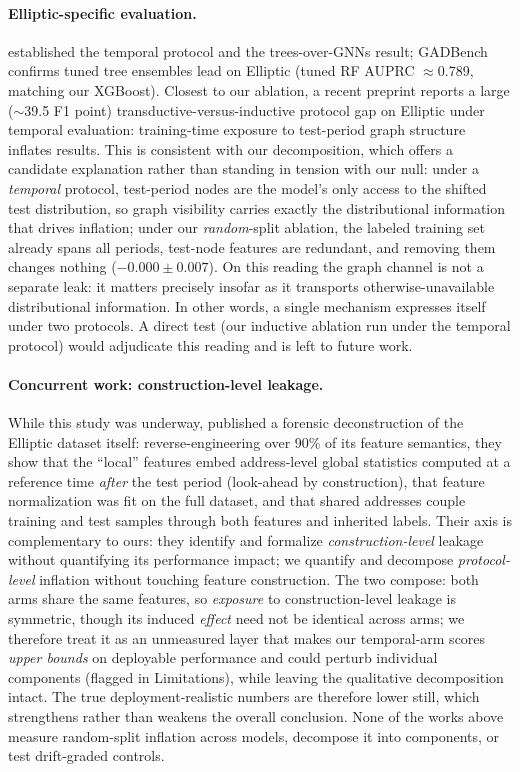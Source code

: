 \documentclass[10pt]{article}
\begin{document}
\paragraph{Elliptic-specific evaluation.} \citet{weber2019aml} established the
temporal protocol and the trees-over-GNNs result; GADBench \citep{tang2023gadbench}
confirms tuned tree ensembles lead on Elliptic (tuned RF AUPRC $\approx$0.789,
matching our XGBoost). Closest to our ablation, a recent preprint
\citep{maganti2026liability} reports a large ($\sim$39.5 F1 point)
transductive-versus-inductive protocol gap on Elliptic under temporal evaluation:
training-time exposure to test-period graph structure inflates results. This is
consistent with our decomposition, which offers a candidate explanation rather
than standing in tension with our null: under a \emph{temporal} protocol, test-period nodes are the model's only
access to the shifted test distribution, so graph visibility carries exactly the
distributional information that drives inflation; under our \emph{random}-split
ablation, the labeled training set already spans all periods, test-node features
are redundant, and removing them changes nothing ($-0.000\pm0.007$). On this
reading the graph channel is not a separate leak: it matters precisely insofar as
it transports otherwise-unavailable distributional information. In other words,
a single mechanism expresses itself under two protocols. A direct test (our inductive ablation run under the temporal
protocol) would adjudicate this reading and is left to future work.

\paragraph{Concurrent work: construction-level leakage.} While this study was
underway, \citet{safar2026opacity} published a forensic deconstruction of the
Elliptic dataset itself: reverse-engineering over 90\% of its feature semantics,
they show that the ``local'' features embed address-level global statistics
computed at a reference time \emph{after} the test period (look-ahead by
construction), that feature normalization was fit on the full dataset, and that
shared addresses couple training and test samples through both features and
inherited labels. Their axis is complementary to ours: they identify and formalize
\emph{construction-level} leakage without quantifying its performance impact; we
quantify and decompose \emph{protocol-level} inflation without touching feature
construction. The two compose: both arms share the same features, so \emph{exposure} to
construction-level leakage is symmetric, though its induced \emph{effect} need
not be identical across arms; we therefore treat it as an unmeasured layer that
makes our temporal-arm scores \emph{upper bounds} on deployable performance and
could perturb individual components (flagged in Limitations), while leaving the
qualitative decomposition intact. The true deployment-realistic numbers are
therefore lower still, which strengthens rather than weakens the overall
conclusion. None of the works above
measure random-split inflation across models, decompose it into components, or
test drift-graded controls.
\end{document}
